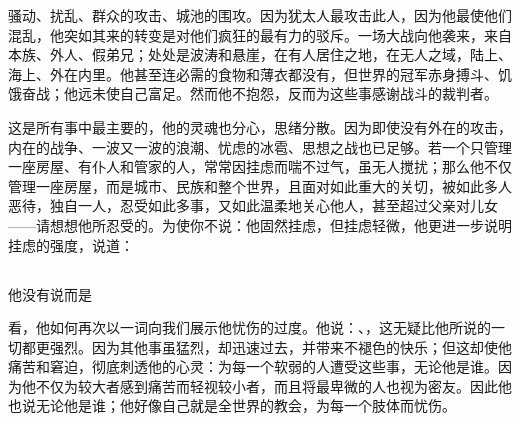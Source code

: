 骚动、扰乱、群众的攻击、城池的围攻。因为犹太人最攻击此人，因为他最使他们混乱，他突如其来的转变是对他们疯狂的最有力的驳斥。一场大战向他袭来，来自本族、外人、假弟兄；处处是波涛和悬崖，在有人居住之地，在无人之域，陆上、海上、外在内里。他甚至连必需的食物和薄衣都没有，但世界的冠军赤身搏斗、饥饿奋战；他远未使自己富足。然而他不抱怨，反而为这些事感谢战斗的裁判者。\par

这是所有事中最主要的，他的灵魂也分心，思绪分散。因为即使没有外在的攻击，内在的战争、一波又一波的浪潮、忧虑的冰雹、思想之战也已足够。若一个只管理一座房屋、有仆人和管家的人，常常因挂虑而喘不过气，虽无人搅扰；那么他不仅管理一座房屋，而是城市、民族和整个世界，且面对如此重大的关切，被如此多人恶待，独自一人，忍受如此多事，又如此温柔地关心他人，甚至超过父亲对儿女——请想想他所忍受的。为使你不说：他固然挂虑，但挂虑轻微，他更进一步说明挂虑的强度，说道：\par


\subsection{}

他没有说而是\par

看，他如何再次以一词向我们展示他忧伤的过度。他说：、，这无疑比他所说的一切都更强烈。因为其他事虽猛烈，却迅速过去，并带来不褪色的快乐；但这却使他痛苦和窘迫，彻底刺透他的心灵：为每一个软弱的人遭受这些事，无论他是谁。因为他不仅为较大者感到痛苦而轻视较小者，而且将最卑微的人也视为密友。因此他也说无论他是谁；他好像自己就是全世界的教会，为每一个肢体而忧伤。\par


\subsection{}

\par

